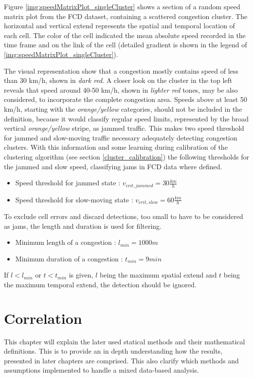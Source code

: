 \documentclass[a4paper,headsepline,footsepline,fontsize=11pt,BCOR=12mm,DIV=12]{report}
\begin{document}
Figure \ref{img:speedMatrixPlot_singleCluster} shows a section of a random speed matrix plot from the FCD dataset, containing a scattered congestion cluster. The horizontal and vertical extend represents the spatial and temporal location of each cell. The color of the cell indicated the mean absolute speed recorded in the time frame and on the link of the cell (detailed gradient is shown in the legend of \ref{img:speedMatrixPlot_singleCluster}).

The visual representation show that a congestion mostly contains speed of less than 30 km/h, shown in \textit{dark red}. A closer look on the cluster in the top left reveals that speed around 40-50 km/h, shown in \textit{lighter red} tones, may be also considered, to incorporate the complete congestion area. Speeds above at least 50 km/h, starting with the \textit{orange/yellow} categories, should not be included in the definition, because it would classify regular speed limits, represented by the broad vertical \textit{orange/yellow} stripe, as jammed traffic. This makes two speed threshold for jammed and slow-moving traffic necessary adequately detecting congestion clusters. With this information and some learning during calibration of the clustering algorithm (see section \ref{cluster_calibration}) the following thresholds for the jammed and slow speed, classifying \glspl{jam} in FCD data where defined.

\begin{itemize}
	\item Speed threshold for jammed state : $v_{crit,jammed} = 30 \frac{km}{h}$
	\item Speed threshold for slow-moving state : $v_{crit,slow} = 60 \frac{km}{h}$
\end{itemize}

To exclude cell errors and discard detections, too small to have to be considered as jams, the length and duration is used for filtering. 

\begin{itemize}
	\item Minimum length of a congestion : $l_{min} = 1000 m$
	\item Minimum duration of a congestion : $t_{min} = 9 min$
\end{itemize}

If $l < l_{min}$ or $t < t_{min}$ is given, $l$ being the maximum spatial extend and $t$ being the maximum temporal extend, the detection should be ignored.

\chapter{Correlation}
\label{definition_correlation}
This chapter will explain the later used statical methods and their mathematical definitions. This is to provide an in depth understanding how the results, presented in later chapters are comprised. This also clarify which methods and assumptions implemented to handle a mixed data-based analysis.
\end{document}
